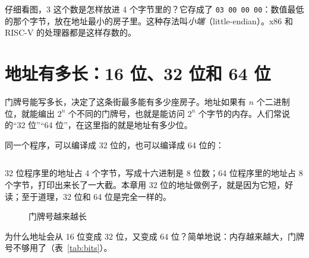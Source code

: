 仔细看图，3 这个数是怎样放进 4 个字节里的？它存成了 \texttt{03 00 00 00}：数值最低的那个字节，放在地址最小的房子里。这种存法叫\emph{小端}（little-endian）。x86 和 RISC-V 的处理器都是这样存数的。

\section{地址有多长：16 位、32 位和 64 位}
\label{sec:bits}

门牌号能写多长，决定了这条街最多能有多少座房子。地址如果有 $n$ 个二进制位，就能编出 $2^n$ 个不同的门牌号，也就是能访问 $2^n$ 个字节的内存。人们常说的“32 位”“64 位”，在这里指的就是地址有多少位。

同一个程序，可以编译成 32 位的，也可以编译成 64 位的：


\inputminted[linenos=false]{text}{code/ch04/out/bits.txt}

32 位程序里的地址占 4 个字节，写成十六进制是 8 位数；64 位程序里的地址占 8 个字节，打印出来长了一大截。本章用 32 位的地址做例子，就是因为它短，好读；至于道理，32 位和 64 位是完全一样的。

\begin{figure}[htbp]
  \begin{lazywide}
  \caption{门牌号越来越长}
  \label{fig:plates-grow}
  \end{lazywide}
\end{figure}

为什么地址会从 16 位变成 32 位，又变成 64 位？简单地说：内存越来越大，门牌号不够用了（表~\ref{tab:bits}）。


